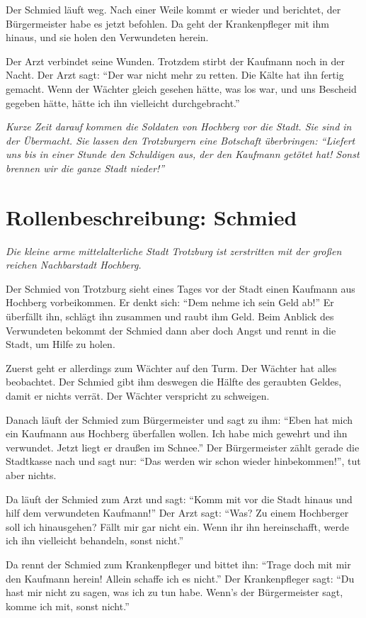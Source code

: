 Der Schmied läuft weg. Nach einer Weile kommt er wieder und berichtet, der Bürgermeister habe es jetzt befohlen. Da geht der Krankenpfleger mit ihm hinaus, und sie holen den Verwundeten herein.

Der Arzt verbindet seine Wunden. Trotzdem stirbt der Kaufmann noch in der Nacht. Der Arzt sagt: "`Der war nicht mehr zu retten. Die Kälte hat ihn fertig gemacht. Wenn der Wächter gleich gesehen hätte, was los war, und uns Bescheid gegeben hätte, hätte ich ihn vielleicht durchgebracht."'

\emph{Kurze Zeit darauf kommen die Soldaten von Hochberg vor die Stadt. Sie sind in der Übermacht. Sie lassen den Trotzburgern eine Botschaft überbringen: "`Liefert uns bis in einer Stunde den Schuldigen aus, der den Kaufmann getötet hat! Sonst brennen wir die ganze Stadt nieder!"'}
\newpage

\section*{Rollenbeschreibung: Schmied}

\emph{Die kleine arme mittelalterliche Stadt Trotzburg ist zerstritten mit der großen reichen Nachbarstadt Hochberg.}

Der Schmied von Trotzburg sieht eines Tages vor der Stadt einen Kaufmann aus Hochberg vorbeikommen. Er denkt sich: "`Dem nehme ich sein Geld ab!"' Er überfällt ihn, schlägt ihn zusammen und raubt ihm Geld. Beim Anblick des Verwundeten bekommt der Schmied dann aber doch Angst und rennt in die Stadt, um Hilfe zu holen.

Zuerst geht er allerdings zum Wächter auf den Turm. Der Wächter hat alles beobachtet. Der Schmied gibt ihm deswegen die Hälfte des geraubten Geldes, damit er nichts verrät. Der Wächter verspricht zu schweigen.

Danach läuft der Schmied zum Bürgermeister und sagt zu ihm: "`Eben hat mich ein Kaufmann aus Hochberg überfallen wollen. Ich habe mich gewehrt und ihn verwundet. Jetzt liegt er draußen im Schnee."' Der Bürgermeister zählt gerade die Stadtkasse nach und sagt nur: "`Das werden wir schon wieder hinbekommen!"', tut aber nichts.

Da läuft der Schmied zum Arzt und sagt: "`Komm mit vor die Stadt hinaus und hilf dem verwundeten Kaufmann!"' Der Arzt sagt: "`Was? Zu einem Hochberger soll ich hinausgehen? Fällt mir gar nicht ein. Wenn ihr ihn hereinschafft, werde ich ihn vielleicht behandeln, sonst nicht."'

Da rennt der Schmied zum Krankenpfleger und bittet ihn: "`Trage doch mit mir den Kaufmann herein! Allein schaffe ich es nicht."' Der Krankenpfleger sagt: "`Du hast mir nicht zu sagen, was ich zu tun habe. Wenn's der Bürgermeister sagt, komme ich mit, sonst nicht."'

